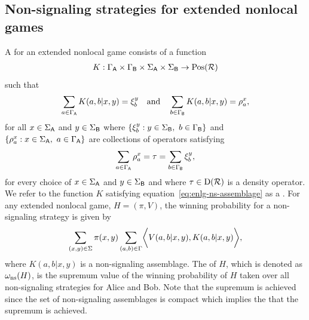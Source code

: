 
\subsection{Non-signaling strategies for extended nonlocal games} \label{sec:non-signaling-strategies-extended-nonlocal-games}

A  for an extended nonlocal game consists of a function
\begin{align}
	K: \Gamma_{\mathsf{A}} \times \Gamma_{\mathsf{B}} \times \Sigma_{\mathsf{A}} \times \Sigma_{\mathsf{B}} \rightarrow \mathrm{Pos}(\mathcal{R})
\end{align}
such that
\begin{align} \label{eq:enlg-ns-assemblage}
	\sum_{a \in \Gamma_{\mathsf{A}}} K(a,b|x,y) = \xi_b^y \quad \textnormal{and} \quad \sum_{b \in \Gamma_{\mathsf{B}}} K(a,b|x,y) = \rho_a^x,
\end{align}
for all $x \in \Sigma_{\mathsf{A}}$ and $y \in \Sigma_{\mathsf{B}}$ where $\left\{ \xi_b^y : y \in \Sigma_{\mathsf{B}}, \ b \in \Gamma_{\mathsf{B}} \right \}$ and $\left \{ \rho_a^x : x \in \Sigma_{\mathsf{A}}, \ a \in \Gamma_{\mathsf{A}} \right \}$ are collections of operators satisfying 
\begin{align}
	\sum_{a \in \Gamma_{\mathsf{A}}} \rho_a^x = \tau = \sum_{b \in \Gamma_{\mathsf{B}}} \xi_b^y,
\end{align}
for every choice of $x \in \Sigma_{\mathsf{A}}$ and $y \in \Sigma_{\mathsf{B}}$ and where $\tau \in \mathrm{D}(\mathcal{R})$ is a density operator. We refer to the function $K$ satisfying equation~\eqref{eq:enlg-ns-assemblage} as a . For any extended nonlocal game, $H = (\pi,V)$, the winning probability for a non-signaling strategy is given by
\begin{align}
	\sum_{(x,y) \in \Sigma} \pi(x,y) \sum_{(a,b) \in \Gamma} \biggl\langle V(a,b|x,y), K(a,b|x,y) \biggr\rangle,
\end{align}
where $K(a,b|x,y)$ is a non-signaling assemblage. The  of $H$, which is denoted as $\omega_{\textnormal{ns}}(H)$, is the supremum value of the winning probability of $H$ taken over all non-signaling strategies for Alice and Bob. Note that the supremum is achieved since the set of non-signaling assemblages is compact which implies the that the supremum is achieved. 

